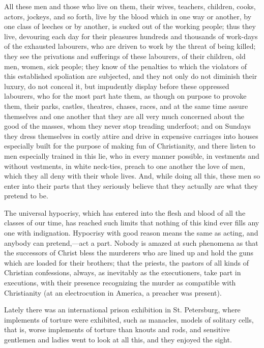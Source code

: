 \documentclass{book}
\begin{document}
All these men and those who live on them, their wives, teachers, children, cooks, actors, jockeys, and so forth, live by the blood which in one way or another, by one class of leeches or by another, is sucked out of the working people; thus they live, devouring each day for their pleasures hundreds and thousands of work-days of the exhausted labourers, who are driven to work by the threat of being killed; they see the privations and sufferings of these labourers, of their children, old men, women, sick people; they know of the penalties to which the violators of this established spoliation are subjected, and they not only do not diminish their luxury, do not conceal it, but impudently display before these oppressed labourers, who for the most part hate them, as though on purpose to provoke them, their parks, castles, theatres, chases, races, and at the same time assure themselves and one another that they are all very much concerned about the good of the masses, whom they never stop treading underfoot; and on Sundays they dress themselves in costly attire and drive in expensive carriages into houses especially built for the purpose of making fun of Christianity, and there listen to men especially trained in this lie, who in every manner possible, in vestments and without vestments, in white neck-ties, preach to one another the love of men, which they all deny with their whole lives. And, while doing all this, these men so enter into their parts that they seriously believe that they actually are what they pretend to be.

The universal hypocrisy, which has entered into the flesh and blood of all the classes of our time, has reached such limits that nothing of this kind ever fills any one with indignation. Hypocrisy with good reason means the same as acting, and anybody can pretend,—act a part. Nobody is amazed at such phenomena as that the successors of Christ bless the murderers who are lined up and hold the guns which are loaded for their brothers; that the priests, the pastors of all kinds of Christian confessions, always, as inevitably as the executioners, take part in executions, with their presence recognizing the murder as compatible with Christianity (at an electrocution in America, a preacher was present).

Lately there was an international prison exhibition in St. Petersburg, where implements of torture were exhibited, such as manacles, models of solitary cells, that is, worse implements of torture than knouts and rods, and sensitive gentlemen and ladies went to look at all this, and they enjoyed the sight.
\end{document}
